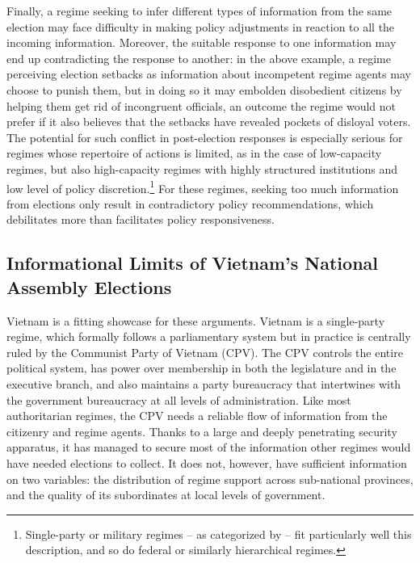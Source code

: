 \documentclass[12pt]{article}
\newcommand{\1}{\mathbbm{1}}
\begin{document}
Finally, a regime seeking to infer different types of information from the same election may face difficulty in making policy adjustments in reaction to all the incoming information. Moreover, the suitable response to one information may end up contradicting the response to another: in the above example, a regime perceiving election setbacks as information about incompetent regime agents may choose to punish them, but in doing so it may embolden disobedient citizens by helping them get rid of incongruent officials, an outcome the regime would not prefer if it also believes that the setbacks have revealed pockets of disloyal voters. The potential for such conflict in post-election responses is especially serious for regimes whose repertoire of actions is limited, as in the case of low-capacity regimes, but also high-capacity regimes with highly structured institutions and low level of policy discretion.\footnote{Single-party or military regimes -- as categorized by \citet{GeddesWrightFrantz2014} -- fit particularly well this description, and so do federal or similarly hierarchical regimes.} For these regimes, seeking too much information from elections only result in contradictory policy recommendations, which debilitates more than facilitates policy responsiveness.

\subsection{Informational Limits of Vietnam's National Assembly Elections}
\label{sec:vietnam_limits}
Vietnam is a fitting showcase for these arguments. Vietnam is a single-party regime, which formally follows a parliamentary system but in practice is centrally ruled by the Communist Party of Vietnam (CPV). The CPV controls the entire political system, has power over membership in both the legislature and in the executive branch, and also maintains a party bureaucracy that intertwines with the government bureaucracy at all levels of administration. Like most authoritarian regimes, the CPV needs a reliable flow of information from the citizenry and regime agents. Thanks to a large and deeply penetrating security apparatus, it has managed to secure most of the information other regimes would have needed elections to collect. It does not, however, have sufficient information on two variables: the distribution of regime support across sub-national provinces, and the quality of its subordinates at local levels of government. 
\end{document}
